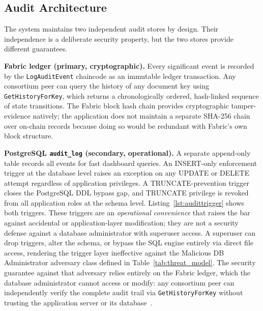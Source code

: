 \documentclass{ieeeaccess}
\begin{document}
\subsection{Audit Architecture}
\label{sec:audit}

The system maintains two independent audit stores by design. Their
independence is a deliberate security property, but the two stores
provide different guarantees.

\textbf{Fabric ledger (primary, cryptographic).} Every significant
event is recorded by the \texttt{LogAuditEvent} chaincode as an
immutable ledger transaction. Any consortium peer can query the
history of any document key using \texttt{GetHistoryForKey}, which
returns a chronologically ordered, hash-linked sequence of state
transitions. The Fabric block hash chain provides cryptographic
tamper-evidence natively; the application does not maintain a
separate SHA-256 chain over on-chain records because doing so would
be redundant with Fabric's own block structure.

\textbf{PostgreSQL \texttt{audit\_log} (secondary, operational).}
A separate append-only table records all events for fast dashboard
queries. An INSERT-only enforcement trigger at the database level
raises an exception on any UPDATE or DELETE attempt regardless of
application privileges. A TRUNCATE-prevention trigger closes the
PostgreSQL DDL bypass gap, and TRUNCATE privilege is revoked from
all application roles at the schema level.
Listing~\ref{lst:audittrigger} shows both triggers. These triggers
are an \emph{operational convenience} that raises the bar against
accidental or application-layer modification; they are not a
security defense against a database administrator with superuser
access. A superuser can drop triggers, alter the schema, or bypass
the SQL engine entirely via direct file access, rendering the
trigger layer ineffective against the Malicious DB Administrator
adversary class defined in Table~\ref{tab:threat_model}. The
security guarantee against that adversary relies entirely on the
Fabric ledger, which the database administrator cannot access or
modify: any consortium peer can independently verify the complete
audit trail via \texttt{GetHistoryForKey} without trusting the
application server or its database~\cite{androulaki2018hyperledger}.
\end{document}
